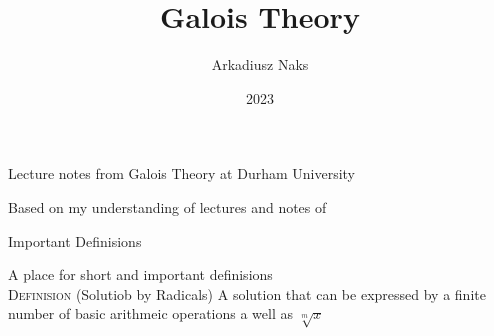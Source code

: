 \documentclass[12pt, letterpaper]{article}
\title{Galois Theory}
\author{Arkadiusz Naks}
\date{2023}
\begin{document}
\begin{titlepage}
  \begin{center}
    \makeatletter
    \vspace*{1cm}
    \Huge
    \textbf{\@title}

    \vspace{0.5cm}
    \Large
    Lecture notes from Galois Theory at Durham University

    \vspace{1.5cm}

    \textbf{\@author}

    \vfill

    \vspace{0.8cm}

    \small
    Based on my understanding of lectures and notes of \\
    \@date{}
  \end{center}
\end{titlepage}

\tableofcontents
\newpage

\begin{section}{Important Definisions}

  A place for short and important definisions \\

  \textsc{Definision} (Solutiob by Radicals) A solution that can be expressed by
  a finite number of basic arithmeic operations a well as \(\sqrt[m]{x}\)

\end{section}
\end{document}
